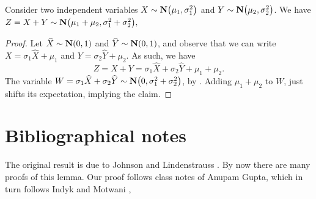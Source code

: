 \begin{lemma}
    Consider two independent variables
    $X \sim \NormalY{\mu_1}{\sigma_1^2}$ and
    $Y \sim \NormalY{\mu_2}{\sigma_2^2}$. We 
    have
    \begin{math}
        Z = X+ Y \sim \NormalY{ \mu_1 + \mu_2 }{ \sigma_1^2 +
           \sigma_2^2},
    \end{math}
\end{lemma}
\begin{proof}
    Let
    $\widehat{X} \sim \NormalY{0}{1}$
    and $\widehat{Y} \sim \NormalY{0}{1}$, and observe that we can
    write $X = \sigma_1 \widehat{X} + \mu_1$ and
    $Y = \sigma_2 \widehat{Y} + \mu_2$. As such, we have
    \begin{equation*}
        Z%
        =%
        X+Y%
        =%
        \sigma_1 \widehat{X}  + \sigma_2 \widehat{Y} + \mu_1 + \mu_2.
    \end{equation*}
    The variable
    $W = \sigma_1 \widehat{X} + \sigma_2 \widehat{Y} \sim
    \NormalY{0}{\sigma_1^2 + \sigma_2^2}$, by
    . Adding $\mu_1 + \mu_2$ to $W$, just
    shifts its expectation, implying the claim.
\end{proof}






\section{Bibliographical notes} 

The original result is due to Johnson and Lindenstrauss
\cite{jl-elmih-84}. By now there are many proofs of this lemma. Our
proof follows class notes of Anupam Gupta, which in turn follows Indyk
and Motwani \cite{im-anntr-98},




\ChapterEnd{}

%
